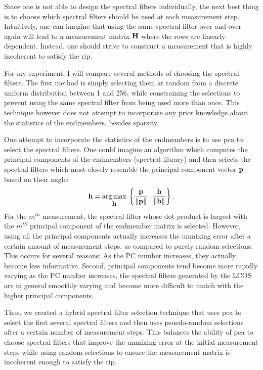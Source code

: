 Since one is not able to design the spectral filters individually, the next best thing is to choose which spectral filters should be used at each measurement step. Intuitively, one can imagine that using the same spectral filter over and over again will lead to a measurement matrix $\displaystyle \mathbf{H}$ where the rows are linearly dependent. Instead, one should strive to construct a measurement that is highly incoherent to satisfy the \acrfull{rip}. 

For my experiment, I will compare several methods of choosing the spectral filters. The first method is simply selecting them at random from a discrete uniform distribution between 1 and 256, while constraining the selections to prevent using the same spectral filter from being used more than once. This technique however does not attempt to incorporate any prior knowledge about the statistics of the endmembers, besides sparsity. 

One attempt to incorporate the statistics of the endmembers is to use \gls{pca} to select the spectral filters. One could imagine an algorithm which computes the principal components of the endmembers (spectral library) and then selects the spectral filters which most closely resemble the principal component vector $\displaystyle \mathbf{p}$ based on their angle:
%
\begin{equation}
	\displaystyle \mathbf{h} = \operatorname*{arg\,max}_{\displaystyle \mathbf{h}} \: \left\{ \frac{ \displaystyle \mathbf{p} }{ \| \displaystyle \mathbf{p} \| } \cdot \frac{ \displaystyle \mathbf{h} }{ \| \displaystyle \mathbf{h} \|  } \right\}.
\end{equation}
%
For the $m^{th}$ measurement, the spectral filter whose dot product is largest with the $m^{th}$ principal component of the endmember matrix is selected. However, using all the principal components actually increases the unmixing error after a certain amount of measurement steps, as compared to purely random selections. This occurs for several reasons: As the PC number increases, they actually become less informative. Second, principal components tend become more rapidly varying as the PC number increases, the spectral filters generated by the LCOS are in general smoothly varying and become more difficult to match with the higher principal components.

Thus, we created a hybrid spectral filter selection technique that uses \gls{pca} to select the first several spectral filters and then uses psuedo-random selections after a certain number of measurement steps. This balances the ability of \gls{pca} to choose spectral filters that improve the unmixing error at the initial measurement steps while using random selections to ensure the measurement matrix is incoherent enough to satisfy the \gls{rip}.


